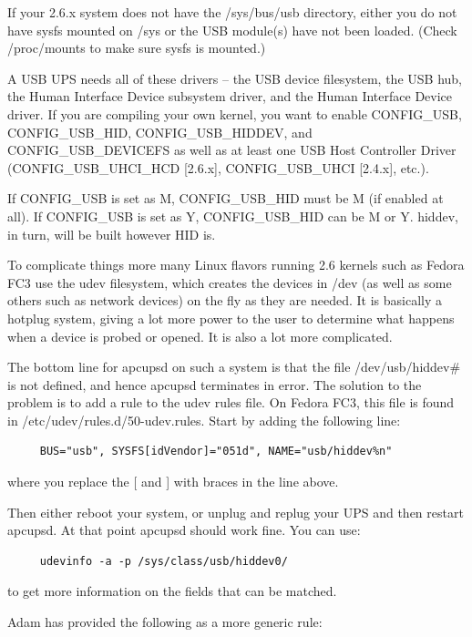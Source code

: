 If your 2.6.x system does not have the /sys/bus/usb directory, either you do
not have sysfs mounted on /sys or the USB module(s) have not been loaded. 
(Check /proc/mounts to make sure sysfs is mounted.)  

A USB UPS needs all of these drivers {--} the USB device filesystem, the USB
hub, the Human Interface Device subsystem driver, and the Human Interface
Device driver. If you are compiling your own kernel, you want to enable
CONFIG\_USB, CONFIG\_USB\_HID, CONFIG\_USB\_HIDDEV, and CONFIG\_USB\_DEVICEFS
as well as at least one USB Host Controller Driver (CONFIG\_USB\_UHCI\_HCD
[2.6.x], CONFIG\_USB\_UHCI [2.4.x], etc.).  

If CONFIG\_USB is set as M, CONFIG\_USB\_HID must be M (if enabled at all). If
CONFIG\_USB is set as Y, CONFIG\_USB\_HID can be M or Y. hiddev, in turn, will
be built however HID is.  

To complicate things more many Linux flavors running 2.6 kernels such as
Fedora FC3 use the udev filesystem, which creates the devices in /dev (as well
as some others such as network devices) on the fly as they are needed. It is
basically a hotplug system, giving a lot more power to the user to determine
what happens when a device is probed or opened. It is also a lot more
complicated.  

The bottom line for apcupsd on such a system is that the file
/dev/usb/hiddev\# is not defined, and hence apcupsd terminates in error. The
solution to the problem is to add a rule to the udev rules file.  On Fedora
FC3, this file is found in /etc/udev/rules.d/50-udev.rules. Start by adding
the following line: 

\footnotesize
\begin{verbatim}
     BUS="usb", SYSFS[idVendor]="051d", NAME="usb/hiddev%n"
\end{verbatim}
\normalsize

where you replace the [ and ] with braces in the line above.  

Then either reboot your system, or unplug and replug your UPS and then restart
apcupsd. At that point apcupsd should work fine.  You can use: 

\footnotesize
\begin{verbatim}
     udevinfo -a -p /sys/class/usb/hiddev0/
\end{verbatim}
\normalsize

to get more information on the fields that can be matched.  

Adam has provided the following as a more generic rule: 

